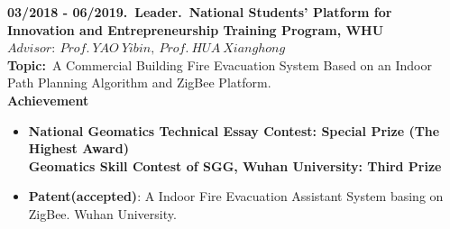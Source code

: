 \documentclass[a4paper]{article}
\begin{document}
\textbf{03/2018 - 06/2019.\ Leader.\ National Students' Platform for Innovation and Entrepreneurship Training Program, WHU}\\
$Advisor:\ Prof.\ YAO\ Yibin,\ Prof.\ HUA\ Xianghong$\\
\textbf{Topic:}\ A Commercial Building Fire Evacuation System Based on an Indoor Path Planning Algorithm and ZigBee Platform.\\
\textbf{Achievement}
\begin{itemize}[itemsep = -0.5em,topsep = 0em]
    \item \textbf{National Geomatics Technical Essay Contest: Special Prize (The Highest Award)\\
              Geomatics Skill Contest of SGG, Wuhan University: Third Prize}
    \item \textbf{Patent(accepted)}: A Indoor Fire Evacuation Assistant System basing on ZigBee. Wuhan University.
\end{itemize}
\end{document}
